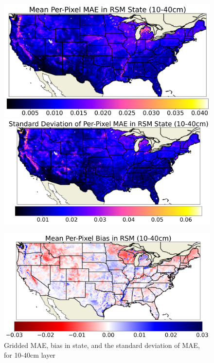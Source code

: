 \begin{figure}[hp!]
    \centering

    \includegraphics[width=.48\linewidth,draft=false]{figures/grid-eval_lstm-rsm-9_full/eval-grid_full_lstm-rsm-9_rsm-40_spatial-stats_abs-err_state-err-abs-mean.png}
    \includegraphics[width=.48\linewidth,draft=false]{figures/grid-eval_lstm-rsm-9_full/eval-grid_full_lstm-rsm-9_rsm-40_spatial-stats_abs-err_state-err-abs-stdev.png}

    \includegraphics[width=.48\linewidth,draft=false]{figures/grid-eval_lstm-rsm-9_full/eval-grid_full_lstm-rsm-9_rsm-40_spatial-stats_bias_state-err-bias-mean.png}

    \caption{Gridded MAE, bias in state, and the standard deviation of MAE, for 10-40cm layer}
    \label{acclstm-rsm-9-grid-rsm-40}
\end{figure}

